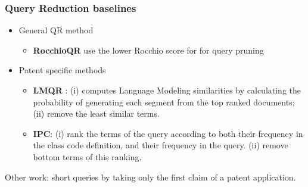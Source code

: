 \documentclass[xcolor=x11names,compress]{beamer}
\renewcommand{\(}{\begin{columns}}
\renewcommand{\)}{\end{columns}}
\newcommand{\<}[1]{\begin{column}{#1}}
\renewcommand{\>}{\end{column}}
\begin{document}
\begin{frame}
\frametitle{Query Reduction baselines}
\begin{itemize}
\item {\color{DeepSkyBlue4}General QR method}
	\begin{itemize}
	\item \textbf{RocchioQR} use the lower Rocchio score for for query pruning
	\end{itemize}	
\item {\color{DeepSkyBlue4}Patent specific methods}	
	\begin{itemize}
	\item \textbf{LMQR} \citep{Ganguly2011}: (i) computes Language Modeling similarities by calculating the probability of generating each segment from the top ranked documents; (ii) remove the least similar terms.
	\item \textbf{IPC}: 
(i) rank the terms of the query according to both their frequency in the class
code definition, and their frequency in the query.
(ii) remove bottom terms of this ranking.
\end{itemize}
\end{itemize}

\vspace{0.5cm}
\begin{small}
{\color{DeepSkyBlue4}Other work}: \citep{Mahdabi2013} short queries by taking only the first claim of a patent application.
\end{small}
\end{frame}
\end{document}
